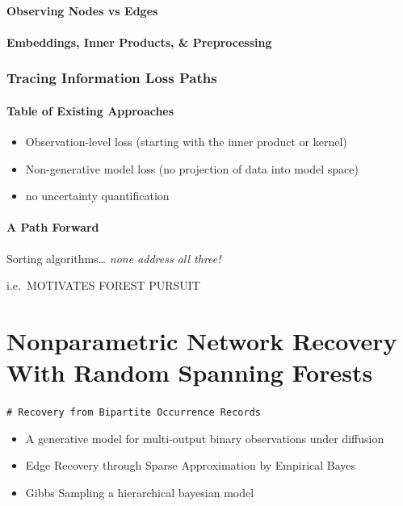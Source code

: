 \documentclass[%
	12pt,
		oneside,
		letterpaper
]{book}
\providecommand{\tightlist}{%
  \setlength{\itemsep}{0pt}\setlength{\parskip}{0pt}}\usepackage{longtable,booktabs,array}
\begin{document}
\subsection{Observing Nodes vs Edges}\label{observing-nodes-vs-edges}

\subsection{Embeddings, Inner Products, \&
Preprocessing}\label{embeddings-inner-products-preprocessing}

\section{Tracing Information Loss
Paths}\label{tracing-information-loss-paths}

\subsection{Table of Existing
Approaches}\label{table-of-existing-approaches}

\begin{itemize}
\tightlist
\item
  Observation-level loss (starting with the inner product or kernel)
\item
  Non-generative model loss (no projection of data into model space)
\item
  no uncertainty quantification
\end{itemize}

\subsection{A Path Forward}\label{a-path-forward}

Sorting algorithms\ldots{} \emph{none address all three!}

i.e.~MOTIVATES FOREST PURSUIT

\part{Nonparametric Network Recovery With Random Spanning Forests}

\texttt{\#\ Recovery\ from\ Bipartite\ Occurrence\ Records}

\begin{itemize}
\tightlist
\item
  A generative model for multi-output binary observations under
  diffusion
\item
  Edge Recovery through Sparse Approximation by Empirical Bayes
\item
  Gibbs Sampling a hierarchical bayesian model
\end{itemize}
\end{document}
